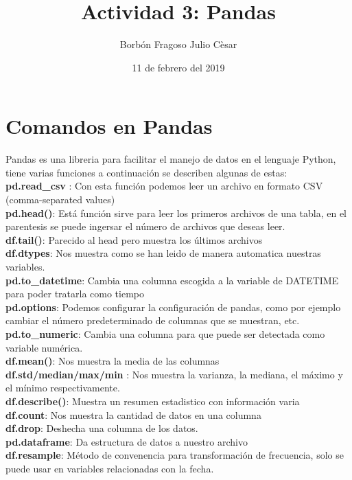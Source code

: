 \documentclass[notitlepage]{report}
\title{Actividad 3: Pandas }
\author{Borbón Fragoso Julio Cèsar }
\date{11 de febrero del 2019}
\begin{document}
\maketitle

\section*{Comandos en Pandas}
Pandas es una libreria para facilitar el manejo de datos en el lenguaje Python, tiene varias funciones a continuación se describen algunas de estas: \\

{\bfseries pd.read\_csv} : Con esta función podemos leer un archivo en formato CSV (comma-separated values) \\
{\bfseries pd.head()}: Está función sirve para leer los primeros archivos de una tabla, en el parentesis se puede ingersar el número de archivos que deseas leer. \\
{\bfseries df.tail()}: Parecido al head pero muestra los últimos archivos
\\
{\bfseries df.dtypes}: Nos muestra como se han leido de manera automatica nuestras variables. 
\\
{\bfseries pd.to\_datetime}: Cambia una columna escogida a la variable de DATETIME para poder tratarla como tiempo 
\\ 
{\bfseries pd.options}: Podemos configurar la configuración de pandas, como por ejemplo cambiar el número predeterminado de columnas que se muestran, etc. 
\\
{\bfseries pd.to\_numeric}: Cambia una columna para que puede ser detectada como variable numérica. 
\\
{\bfseries df.mean()}: Nos muestra la media de las columnas
\\
{\bfseries df.std/median/max/min} : Nos muestra la varianza, la mediana, el máximo y el mínimo respectivamente.
\\
{\bfseries df.describe()}: Muestra un resumen estadistico con información varia
\\
{\bfseries df.count}: Nos muestra la cantidad de datos en una columna
\\
{\bfseries df.drop}: Deshecha una columna de los datos. 
\\
{\bfseries pd.dataframe}: Da  estructura de datos a nuestro archivo 
\\
{\bfseries df.resample}: Método de convenencia para transformación de frecuencia, solo se puede usar en variables relacionadas con la fecha. \\
{\bfseries}
\\
\end{document}
